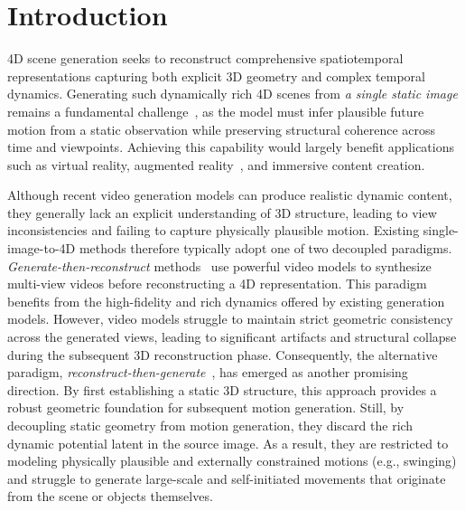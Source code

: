 \section{Introduction}
\label{sec:intro}

4D scene generation seeks to reconstruct comprehensive spatiotemporal representations capturing both explicit 3D geometry and complex temporal dynamics. Generating such dynamically rich 4D scenes from \textit{a single static image} remains a fundamental challenge~\cite{miao2025advances}, as the model must infer plausible future motion from a static observation while preserving structural coherence across time and viewpoints. Achieving this capability would largely benefit applications such as virtual reality, augmented reality~\cite{guo2023vid2avatar,miao2024pla4d}, and immersive content creation.

Although recent video generation models can produce realistic dynamic content, they generally lack an explicit understanding of 3D structure, leading to view inconsistencies and failing to capture physically plausible motion. Existing single-image-to-4D methods therefore typically adopt one of two decoupled paradigms. \textit{Generate-then-reconstruct} methods~\cite{cat4d,4real,dimensionX,free4d} use powerful video models to synthesize multi-view videos before reconstructing a 4D representation. This paradigm benefits from the high-fidelity and rich dynamics offered by existing generation models. 
However, video models struggle to maintain strict geometric consistency across the generated views, leading to significant artifacts and structural collapse during the subsequent 3D reconstruction phase. Consequently, the alternative paradigm, \textit{reconstruct-then-generate}~\cite{animate124,animate3d,gs-dit,jin2025optimizing, gen3c}, has emerged as another promising direction. By first establishing a static 3D structure, this approach provides a robust geometric foundation for subsequent motion generation. 
Still, by decoupling static geometry from motion generation, they discard the rich dynamic potential latent in the source image. As a result, they are restricted to modeling physically plausible and externally constrained motions (e.g., swinging) and struggle to generate large-scale and self-initiated movements that originate from the scene or objects themselves.

